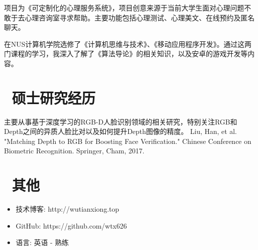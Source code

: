 \documentclass{resume}
\begin{document}
项目为《可定制化的心理服务系统》，项目创意来源于当前大学生面对心理问题不敢于去心理咨询室寻求帮助。主要功能包括心理测试、心理美文、在线预约及匿名聊天。

在NUS计算机学院选修了《计算机思维与技术》、《移动应用程序开发》。通过这两门课程的学习，我深入了解了《算法导论》的相关知识，以及安卓的游戏开发等内容。

\section{\faUsers\ \textbf{硕士研究经历}}
主要从事基于深度学习的RGB-D人脸识别领域的相关研究，特别关注RGB和Depth之间的异质人脸比对以及如何提升Depth图像的精度。
Liu, Han, et al. "Matching Depth to RGB for Boosting Face Verification." Chinese Conference on Biometric Recognition. Springer, Cham, 2017.

\section{\faInfo\ 其他}
\begin{itemize}[parsep=0.5ex]
	\item 技术博客: http://wutianxiong.top
	\item GitHub: https://github.com/wtx626
	\item 语言: 英语 - 熟练
\end{itemize}
\end{document}
